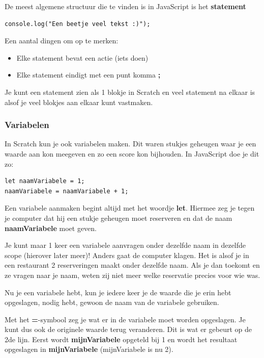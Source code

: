 De meest algemene structuur die te vinden is in JavaScript is het
\textbf{statement} 
\begin{verbatim}
console.log("Een beetje veel tekst :)");
\end{verbatim}
Een aantal dingen om op te merken:
\begin{itemize}
    \item Elke statement bevat een actie (iets doen)
    \item Elke statement eindigt met een punt komma \textbf{;} 
\end{itemize}

Je kunt een statement zien als 1 blokje in Scratch en veel statement na elkaar
is alsof je veel blokjes aan elkaar kunt vastmaken.

\subsubsection{Variabelen}%
\label{ssub:Variabelen}

In Scratch kun je ook variabelen maken. Dit waren stukjes geheugen waar je een 
waarde aan kon meegeven en zo een score kon bijhouden. In JavaScript doe je dit
zo:
\begin{verbatim}
let naamVariabele = 1;
naamVariabele = naamVariabele + 1;
\end{verbatim}
Een variabele aanmaken begint altijd met het woordje \textbf{let}. Hiermee zeg
je tegen je computer dat hij een stukje geheugen moet reserveren en dat de naam
\textbf{naamVariabele} moet geven.

\Opm Je kunt maar 1 keer een variabele aanvragen onder dezelfde naam in
dezelfde scope (hierover later meer)! Anders gaat de computer klagen. Het is
alsof je in een restaurant 2 reserveringen maakt onder  dezelfde naam. Als je
dan toekomt en ze vragen naar je naam, weten zij niet meer welke reservatie
precies voor wie was.

Nu je een variabele hebt, kun je iedere keer je de waarde die je erin hebt
opgeslagen, nodig hebt, gewoon de naam van de variabele gebruiken.

Met het \textbf{=}-symbool zeg je wat er in de variabele moet worden opgeslagen.
Je kunt dus ook de originele waarde terug veranderen. Dit is wat er gebeurt op
de 2de lijn. Eerst wordt \textbf{mijnVariabele} opgeteld bij 1 en wordt het
resultaat opgeslagen in \textbf{mijnVariabele} (mijnVariabele is nu 2).

